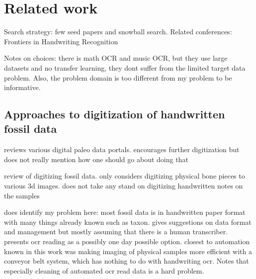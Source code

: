 \documentclass{article}
\begin{document}

\section{Related work}


Search strategy: few seed papers and snowball search. Related conferences: 
Frontiers in Handwriting Recognition

Notes on choices: there is math OCR and music OCR, but they use large datasets and no transfer learning, they dont suffer from the limited target data problem. Also, the problem domain is too different from my problem to be informative.

\subsection{Approaches to digitization of handwritten fossil data}

\cite{uhenCardCatalogsComputers2013} reviews various digital paleo data portals. encourages further digitization but 
does not really mention how one should go about doing that

\cite{mallisonDigitizingMethodsPaleontology2011} review of digitizing fossil data. only considers digitizing 
physical bone pieces to various 3d images. does not take any stand on digitizing handwritten notes on the samples 

\cite{groomImprovedStandardizationTranscribed2019} does identify my problem here: most fossil data is in handwritten paper 
format with many things already known such as taxon. gives suggestions on data format and management but mostly assuming 
that there is a human transcriber. presents ocr reading as a possibly one day possible option. closest to automation 
known in this work was making imaging of physical samples more efficient with a conveyor belt system, which has nothing to 
do with handwriting ocr. Notes that especially cleaning of automated ocr read data is a hard problem.
\end{document}
